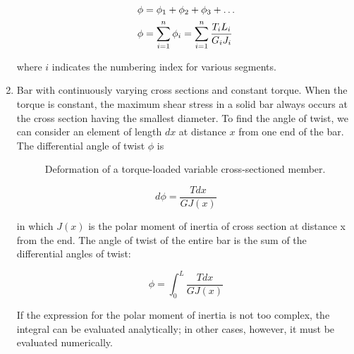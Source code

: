 \documentclass[
10pt,
a4paper,
openany,
svgnames,
]{kaobook} %
\begin{document}
\begin{enumerate}
  \begin{equation}
    \begin{gathered}
      \phi  = {\phi _1} + {\phi _2} + {\phi _3} +  \ldots  \hfill \\
      \phi  = \sum\limits_{i = 1}^n {{\phi _i} = \sum\limits_{i = 1}^n {\dfrac{{{T_i}{L_i}}}{{{G_i}{J_i}}}} }  \hfill \\ 
    \end{gathered}
  \end{equation}
  
  where $i$ indicates the numbering index for various segments.
  
\item Bar with continuously varying cross sections and constant torque. When the torque is constant, the maximum shear stress in a solid bar always occurs at the cross section having the smallest diameter. To find the angle of twist, we can consider an element of length $dx$ at distance $x$ from one end of the bar. The differential angle of twist $\phi$ is
  
  \begin{figure}[h]
    \centering
    \caption{Deformation of a torque-loaded variable cross-sectioned member.}
  \end{figure}
  
  \[d\phi  = \frac{{Tdx}}{{G{J}(x)}}\]
  
  in which $J(x)$ is the polar moment of inertia of cross section at distance x from the end. The angle of twist of the entire bar is the sum of the differential angles of twist:
  
  \begin{equation}
    \phi  = \int_0^L \frac{Tdx}{G{J(x)}}
  \end{equation}
  
  If the expression for the polar moment of inertia is not too complex, the integral can be evaluated analytically; in other cases, however, it must be evaluated numerically.
  

\end{enumerate}
\end{document}
